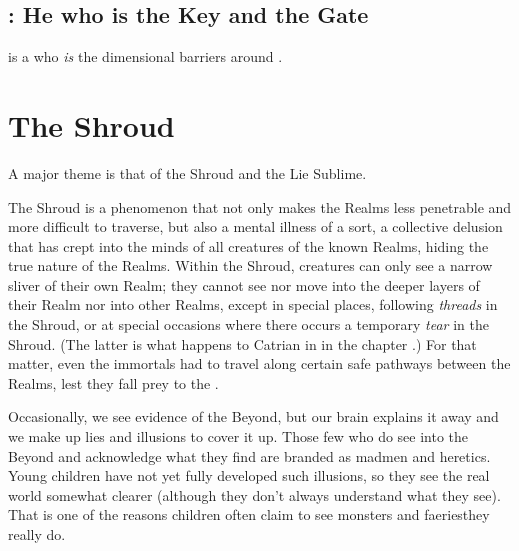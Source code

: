 \subsection{\NaathKurRamalech: He who is the Key and the Gate}
 is a  who \emph{is} the dimensional barriers around \Miith{}. 
















\section{The Shroud}

A major theme is that of the Shroud and the Lie Sublime. 

The Shroud is a phenomenon that not only makes the Realms less penetrable and more difficult to traverse, but also a mental illness of a sort, a collective delusion that has crept into the minds of all creatures of the known Realms, hiding the true nature of the Realms. Within the Shroud, creatures can only see a narrow sliver of their own Realm; they cannot see nor move into the deeper layers of their Realm nor into other Realms, except in special places, following \emph{threads} in the Shroud, or at special occasions where there occurs a temporary \emph{tear} in the Shroud. (The latter is what happens to Catrian in \TwilightAngelRememberEmph in the chapter .)
For that matter, even the immortals had to travel along certain safe pathways between the Realms, lest they fall prey to the . 

Occasionally, we see evidence of the Beyond, but our brain explains it away and we make up lies and illusions to cover it up. 
Those few who do see into the Beyond and acknowledge what they find are branded as madmen and heretics. 
Young children have not yet fully developed such illusions, so they see the real world somewhat clearer (although they don't always understand what they see). That is one of the reasons children often claim to see monsters and faeries\dash they really do. 


